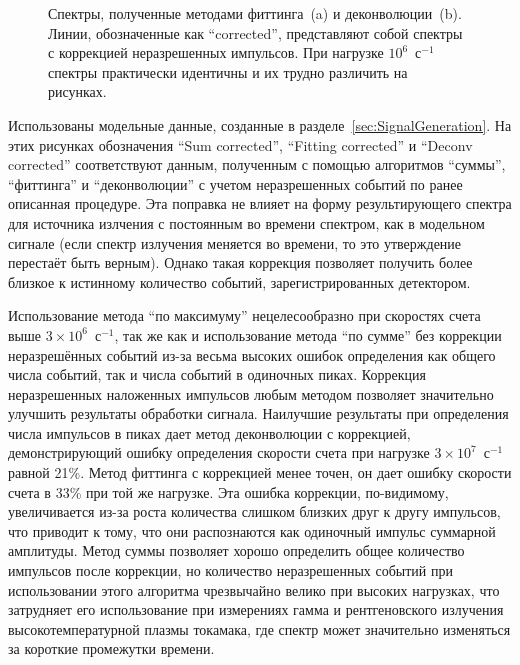 \begin{figure}[ht!]
  \caption{ Спектры, полученные методами фиттинга~(a) и деконволюции~(b). Линии, обозначенные как ``corrected'', представляют собой спектры с коррекцией неразрешенных импульсов. При нагрузке $10^6$~с${}^{-1}$ спектры практически идентичны и их трудно различить на рисунках.~\cite{Khilkevitch2020} }
  \label{fig:processingSpectrumCmpByCountRate}
\end{figure}


Использованы модельные данные, созданные в разделе~\ref{sec:SignalGeneration}. На этих рисунках обозначения ``Sum corrected'', ``Fitting corrected'' и ``Deconv corrected'' соответствуют данным, полученным с помощью алгоритмов ``суммы'', ``фиттинга'' и ``деконволюции'' с учетом неразрешенных событий по ранее описанная процедуре. Эта поправка не влияет на форму результирующего спектра для источника излчения с постоянным во времени спектром, как в модельном сигнале (если спектр излучения меняется во времени, то это утверждение перестаёт быть верным). Однако такая коррекция позволяет получить более близкое к истинному количество событий, зарегистрированных детектором.

Использование метода ``по максимуму'' нецелесообразно при скоростях счета выше $3 \times 10^6$~с${}^{-1}$, так же как и использование метода ``по сумме'' без коррекции неразрешённых событий из-за весьма высоких ошибок определения как общего числа событий, так и числа событий в одиночных пиках. Коррекция неразрешенных наложенных импульсов любым методом позволяет значительно улучшить результаты обработки сигнала. Наилучшие результаты при определения числа импульсов в пиках дает метод деконволюции с коррекцией, демонстрирующий ошибку определения скорости счета при нагрузке $3 \times 10^7$~с${}^{-1}$ равной 21\%. Метод фиттинга с коррекцией менее точен, он дает ошибку скорости счета в 33\% при той же нагрузке. Эта ошибка коррекции, по-видимому, увеличивается из-за роста количества слишком близких друг к другу импульсов, что приводит к тому, что они распознаются как одиночный импульс суммарной амплитуды. Метод суммы позволяет хорошо определить общее количество импульсов после коррекции, но количество неразрешенных событий при использовании этого алгоритма чрезвычайно велико при высоких нагрузках, что затрудняет его использование при измерениях гамма и рентгеновского излучения высокотемпературной плазмы токамака, где спектр может значительно изменяться за короткие промежутки времени.

